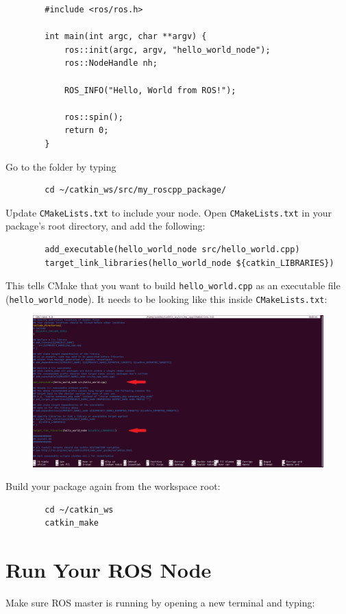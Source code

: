 \documentclass[12pt,a4paper]{article}
\begin{document}
	\begin{verbatim}
		#include <ros/ros.h>
		
		int main(int argc, char **argv) {
			ros::init(argc, argv, "hello_world_node");
			ros::NodeHandle nh;
			
			ROS_INFO("Hello, World from ROS!");
			
			ros::spin();
			return 0;
		}
	\end{verbatim}
	\noindent Go to the folder by typing
	\begin{verbatim}
		cd ~/catkin_ws/src/my_roscpp_package/
	\end{verbatim}
	Update \texttt{CMakeLists.txt} to include your node. Open \texttt{CMakeLists.txt} in your package's root directory, and add the following:
	
	\begin{verbatim}
		add_executable(hello_world_node src/hello_world.cpp)
		target_link_libraries(hello_world_node ${catkin_LIBRARIES})
	\end{verbatim}
	\clearpage
	\noindent This tells CMake that you want to build 
	\texttt{hello\_world.cpp} as an executable file \\(\texttt{hello\_world\_node}).
	It needs to be looking like this inside \texttt{CMakeLists.txt}:
	\begin{figure}[!h]
		\centering
		\includegraphics[width=\linewidth]{vmware3}
	\end{figure}
	
	\noindent Build your package again from the workspace root:
	\begin{verbatim}
		cd ~/catkin_ws
		catkin_make
	\end{verbatim}
	
	\section{Run Your ROS Node}
	Make sure ROS master is running by opening a new terminal and typing:
	
\end{document}
